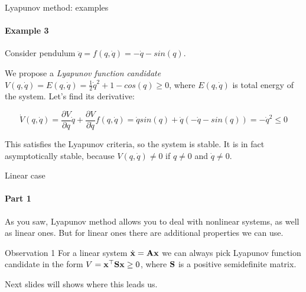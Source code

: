 \documentclass{beamer}
\begin{document}
\begin{frame}{Lyapunov method: examples}
\framesubtitle{Example 3}
\begin{flushleft}

Consider pendulum $\ddot{q} = f(q, \dot{q}) = -\dot{q} - sin(q)$. 

\bigskip

We propose a \emph{Lyapunov function candidate} $V(q, \dot{q}) = E(q, \dot{q}) = \frac{1}{2} \dot{q}^2 + 1 - cos(q)\geq 0$, where $E(q, \dot{q})$ is total energy of the system. Let's find its derivative:

\begin{equation}
    \dot V(q, \dot{q}) = 
    \frac{\partial V}{\partial q}       \dot{q} +
    \frac{\partial V}{\partial \dot{q}} f(q, \dot{q}) = 
    \dot{q} sin(q) + \dot{q}(-\dot{q} - sin(q)) =
    -\dot{q}^2 \leq 0
\end{equation}


This satisfies the Lyapunov criteria, so the system is stable. It is in fact asymptotically stable, because $V(q, \dot{q}) \neq 0$ if $q \neq 0$ and $\dot{q} \neq 0$.

\end{flushleft}
\end{frame}


\begin{frame}{Linear case}
\framesubtitle{Part 1}
\begin{flushleft}

As you saw, Lyapunov method allows you to deal with nonlinear systems, as well as linear ones. But for linear ones there are additional properties we can use.

\begin{block}{Observation 1}
For a linear system $\dot{\mathbf{x}} = \mathbf{A}\mathbf{x}$ we can always pick Lyapunov function candidate in the form $V = \mathbf{x}^\top\mathbf{S}\mathbf{x} \geq 0$, where $\mathbf{S}$ is a positive semidefinite matrix.
\end{block}

\bigskip

Next slides will shows where this leads us.

\end{flushleft}
\end{frame}
\end{document}
